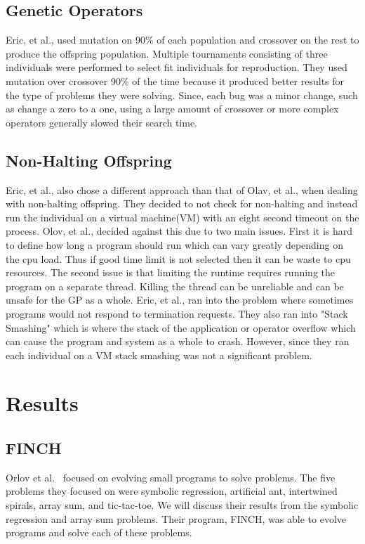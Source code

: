 \documentclass{sig-alternate}
\begin{document}
  

\subsection{Genetic Operators}
Eric, et al., used mutation on 90\% of each population and crossover on the rest to produce the offspring population. Multiple tournaments consisting of three individuals were performed to select fit individuals for reproduction. They used mutation over crossover 90\% of the time because it produced better results for the type of problems they were solving. Since, each bug was a minor change, such as change a zero to a one, using a large amount of crossover or more complex operators generally slowed their search time.  

\subsection{Non-Halting Offspring}

Eric, et al., also chose a different approach than that of Olav, et al., when dealing with non-halting offspring. They decided to not check for non-halting and instead run the individual on a virtual machine(VM) with an eight second timeout on the process. Olov, et al., decided against this due to two main issues. First it is hard to define how long a program should run which can vary greatly depending on the cpu load. Thus if good time limit is not selected then it can be waste to cpu resources. The second issue is that limiting the runtime requires running the program on a separate thread. Killing the thread can be unreliable and can be unsafe for the GP as a whole. Eric, et al., ran into the problem where sometimes programs would not respond to termination requests.
They also ran into "Stack Smashing" which is where the stack of the application or operator overflow which can cause the program and system as a whole to crash. However, since they ran each individual on a VM stack smashing was not a significant problem.




\section{Results}
\subsection{FINCH}
Orlov et al.~\cite{FINCH:2011} focused on evolving small programs to solve problems. The five problems they focused on were symbolic regression, artificial ant, intertwined spirals, array sum, and tic-tac-toe. We will discuss their results from the symbolic regression and array sum problems. Their program, FINCH, was able to evolve programs and solve each of these problems.
\end{document}
